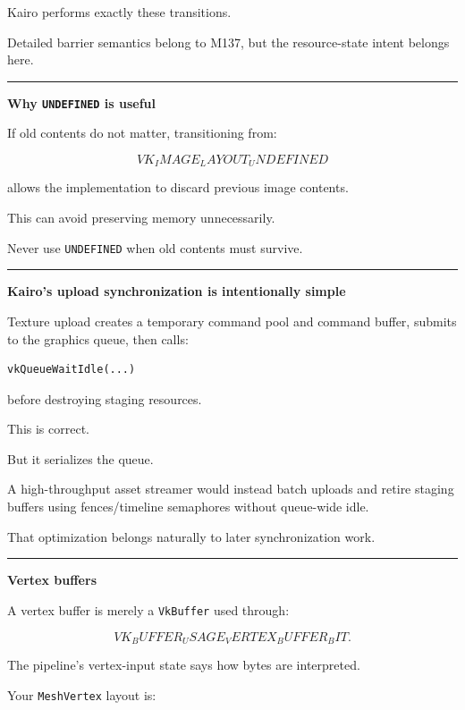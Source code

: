 Kairo performs exactly these transitions.

Detailed barrier semantics belong to M137, but the resource-state intent belongs here.

\begin{center}\rule{0.5\linewidth}{0.5pt}\end{center}

\textbf{Why \texttt{UNDEFINED} is useful}

If old contents do not matter, transitioning from:

\[
VK_IMAGE_LAYOUT_UNDEFINED
\]

allows the implementation to discard previous image contents.

This can avoid preserving memory unnecessarily.

Never use \texttt{UNDEFINED} when old contents must survive.

\begin{center}\rule{0.5\linewidth}{0.5pt}\end{center}

\textbf{Kairo's upload synchronization is intentionally simple}

Texture upload creates a temporary command pool and command buffer, submits to the graphics queue, then calls:

\begin{verbatim}
vkQueueWaitIdle(...)
\end{verbatim}

before destroying staging resources.

This is correct.

But it serializes the queue.

A high-throughput asset streamer would instead batch uploads and retire staging buffers using fences/timeline semaphores without queue-wide idle.

That optimization belongs naturally to later synchronization work.

\begin{center}\rule{0.5\linewidth}{0.5pt}\end{center}

\textbf{Vertex buffers}

A vertex buffer is merely a \texttt{VkBuffer} used through:

\[
VK_BUFFER_USAGE_VERTEX_BUFFER_BIT.
\]

The pipeline's vertex-input state says how bytes are interpreted.

Your \texttt{MeshVertex} layout is:


